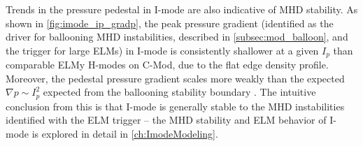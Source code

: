 \begin{figure}
 \pushtooutside
\end{figure}

Trends in the pressure pedestal in I-mode are also indicative of MHD stability.  As shown in \cref{fig:imode_ip_gradp}, the peak pressure gradient (identified as the driver for ballooning MHD instabilities, described in \cref{subsec:mod_balloon}, and the trigger for large ELMs) in I-mode is consistently shallower at a given $I_p$ than comparable ELMy H-modes on C-Mod, due to the flat edge density profile.  Moreover, the pedestal pressure gradient scales more weakly than the expected $\nabla p \sim I_p^2$ expected from the ballooning stability boundary \cite{Connor1978}.  The intuitive conclusion from this is that I-mode is generally stable to the MHD instabilities identified with the ELM trigger -- the MHD stability and ELM behavior of I-mode is explored in detail in \cref{ch:ImodeModeling}.\nicesectionending

